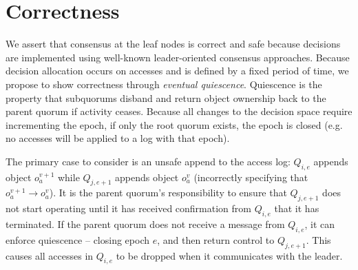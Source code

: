 \documentclass[11pt,letterpaper]{article}
\begin{document}
\section{Correctness}
\vspace{-.5em}


We assert that consensus at the leaf nodes is correct and safe because decisions are
implemented using well-known leader-oriented consensus approaches.
Because decision allocation occurs on accesses and is defined by a fixed period of time,
we propose to show correctness through \emph{eventual quiescence}.
Quiescence is the property that subquorums disband and return object ownership
back to the parent quorum if activity ceases.
Because all changes to the decision space require incrementing the epoch, if only the
root quorum exists, the epoch is closed (e.g. no accesses will be applied to a log with
that epoch).

The primary case to consider is an unsafe append to the access log: $Q_{i,e}$
appends object $o_a^{v+1}$ while $Q_{j,e+1}$ appends object $o_a^v$ (incorrectly
specifying that $o_a^{v+1} \rightarrow o_a^v$).
It is the parent quorum's responsibility to ensure that $Q_{j,e+1}$ does not start
operating until it has received confirmation from $Q_{i,e}$ that it has terminated.
If the parent quorum does not receive a message from $Q_{i,e}$, it can enforce quiescence
-- closing epoch $e$, and then return control to $Q_{j,e+1}$. This causes all accesses in
$Q_{i,e}$ to be dropped when it communicates with the leader.
\end{document}
